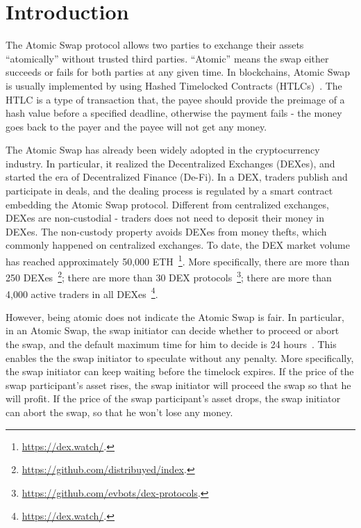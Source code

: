 \section{Introduction}
\label{sec:intro}

The Atomic Swap protocol allows two parties to exchange their assets ``atomically'' without trusted third parties.
``Atomic'' means the swap either succeeds or fails for both parties at any given time.
In blockchains, Atomic Swap is usually implemented by using Hashed Timelocked Contracts (HTLCs)~\cite{decker2015fast}.
The HTLC is a type of transaction that, the payee should provide the preimage of a hash value before a specified deadline, otherwise the payment fails - the money goes back to the payer and the payee will not get any money.

The Atomic Swap has already been widely adopted in the cryptocurrency industry.
In particular, it realized the Decentralized Exchanges (DEXes), and started the era of Decentralized Finance (De-Fi).
In a DEX, traders publish and participate in deals, and the dealing process is regulated by a smart contract embedding the Atomic Swap protocol.
Different from centralized exchanges, DEXes are non-custodial - traders does not need to deposit their money in DEXes.
The non-custody property avoids DEXes from money thefts, which commonly happened on centralized exchanges.
To date, the DEX market volume has reached approximately 50,000 ETH~\footnote{\url{https://dex.watch/}.}.
More specifically,
there are more than 250 DEXes~\footnote{\url{https://github.com/distribuyed/index}.};
there are more than 30 DEX protocols~\footnote{\url{https://github.com/evbots/dex-protocols}.};
there are more than 4,000 active traders in all DEXes~\footnote{\url{https://dex.watch/}.}.



However, being atomic does not indicate the Atomic Swap is fair.
In particular, in an Atomic Swap, the swap initiator can decide whether to proceed or abort the swap, and the default maximum time for him to decide is 24 hours~\cite{nolan2013alt}.
This enables the the swap initiator to speculate without any penalty.
More specifically, the swap initiator can keep waiting before the timelock expires.
If the price of the swap participant's asset rises, the swap initiator will proceed the swap so that he will profit.
If the price of the swap participant's asset drops, the swap initiator can abort the swap, so that he won't lose any money.

